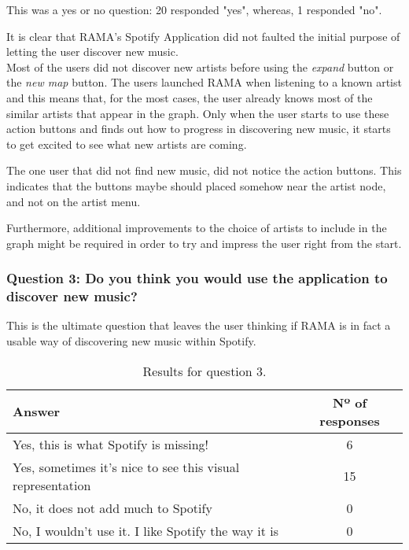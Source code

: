       This was a yes or no question: 20 responded "yes", whereas, 1 responded "no".

      It is clear that RAMA's Spotify Application did not faulted the initial purpose of letting the user discover new music. \\

      Most of the users did not discover new artists before using the \emph{expand} button or the \emph{new map} button.
      The users launched RAMA when listening to a known artist and this means that, for the most cases, the user already knows most of the similar artists that appear in the graph.
      Only when the user starts to use these action buttons and finds out how to progress in discovering new music, it starts to get excited to see what new artists are coming.

      The one user that did not find new music, did not notice the action buttons.
      This indicates that the buttons maybe should placed somehow near the artist node, and not on the artist menu.

      Furthermore, additional improvements to the choice of artists to include in the graph might be required in order to try and impress the user right from the start.

    \subsubsection{Question 3: Do you think you would use the application to discover new music?}
    \label{ssub:question_3}

      This is the ultimate question that leaves the user thinking if RAMA is in fact a usable way of discovering new music within Spotify.

      \begin{table}[H]
         \begin{center}
           \begin{tabular}{l|c}
       
           \hline
           \textbf{Answer} & \textbf{Nº of responses} \\
           \hline

           \hline
            Yes, this is what Spotify is missing! & 6 \\
            Yes, sometimes it's nice to see this visual representation & 15 \\
            No, it does not add much to Spotify & 0 \\
            No, I wouldn't use it. I like Spotify the way it is & 0 \\
           \hline
           \end{tabular}
         \end{center}
         \caption{Results for question 3.}
         \label{tab:question3}
       \end{table}

